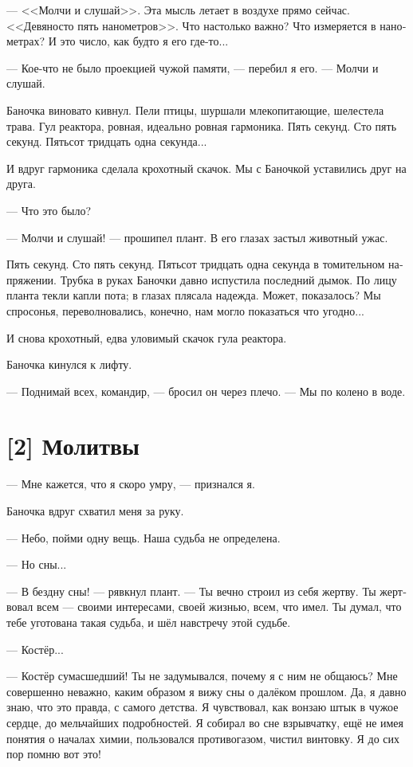 \documentclass[a4paper,12pt,fleqn]{book}\usepackage{cooltooltips}\usepackage{polyglossia}\setdefaultlanguage[babelshorthands=true]{russian}\setotherlanguage{english}\defaultfontfeatures{Ligatures=TeX,Mapping=tex-text} \usepackage{xcolor}\definecolor{lightgray}{HTML}{bbbbbb}\color{lightgray}\newcommand{\ml}[3]{\textenglish{\textcolor{black}{#3}}}
\begin{document}
{--- <<Молчи и слушай>>.
Эта мысль летает в воздухе прямо сейчас.
<<Девяносто пять нанометров>>.
Что настолько важно?
Что измеряется в нанометрах?
И это число, как будто я его где-то...

--- Кое-что не было проекцией чужой памяти, --- перебил я его.
--- Молчи и слушай.

Баночка виновато кивнул.
Пели птицы, шуршали млекопитающие, шелестела трава.
Гул реактора, ровная, идеально ровная гармоника.
Пять секунд.
Сто пять секунд.
Пятьсот тридцать одна секунда...

И вдруг гармоника сделала крохотный скачок.
Мы с Баночкой уставились друг на друга.

--- Что это было?

--- Молчи и слушай! --- прошипел плант.
В его глазах застыл животный ужас.

Пять секунд.
Сто пять секунд.
Пятьсот тридцать одна секунда в томительном напряжении.
Трубка в руках Баночки давно испустила последний дымок.
По лицу планта текли капли пота;
в глазах плясала надежда.
Может, показалось?
Мы спросонья, переволновались, конечно, нам могло показаться что угодно...

И снова крохотный, едва уловимый скачок гула реактора.

Баночка кинулся к лифту.

--- Поднимай всех, командир, --- бросил он через плечо.
--- Мы по колено в воде.

\section{[2] Молитвы}

--- Мне кажется, что я скоро умру, --- признался я.

Баночка вдруг схватил меня за руку.

--- Небо, пойми одну вещь.
Наша судьба не определена.

--- Но сны...

--- В бездну сны! --- рявкнул плант.
--- Ты вечно строил из себя жертву.
Ты жертвовал всем --- своими интересами, своей жизнью, всем, что имел.
Ты думал, что тебе уготована такая судьба, и шёл навстречу этой судьбе.

--- Костёр...

--- Костёр сумасшедший!
Ты не задумывался, почему я с ним не общаюсь?
Мне совершенно неважно, каким образом я вижу сны о далёком прошлом.
Да, я давно знаю, что это правда, с самого детства.
Я чувствовал, как вонзаю штык в чужое сердце, до мельчайших подробностей.
Я собирал во сне взрывчатку, ещё не имея понятия о началах химии, пользовался противогазом, чистил винтовку.
Я до сих пор помню вот это!

}
\end{document}
